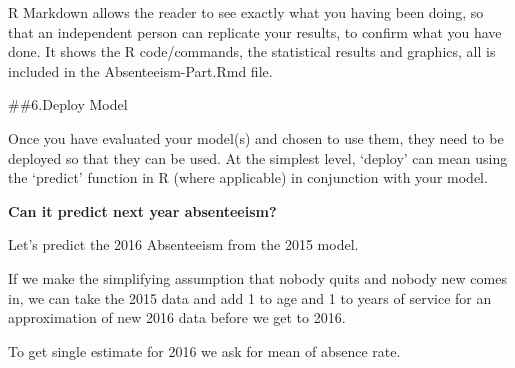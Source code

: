 \documentclass[12pt, krantz2,]{krantz}
\makeatletter
\newenvironment{Shaded}{\begin{snugshade}}{\end{snugshade}}
\newcommand{\CommentTok}[1]{\textcolor[rgb]{0.37,0.37,0.37}{\textit{#1}}}
\newcommand{\DataTypeTok}[1]{\textcolor[rgb]{0.27,0.27,0.27}{#1}}
\newcommand{\DecValTok}[1]{\textcolor[rgb]{0.06,0.06,0.06}{#1}}
\newcommand{\KeywordTok}[1]{\textcolor[rgb]{0.27,0.27,0.27}{\textbf{#1}}}
\newcommand{\NormalTok}[1]{#1}
\newcommand{\OperatorTok}[1]{\textcolor[rgb]{0.43,0.43,0.43}{\textbf{#1}}}
\newcommand{\StringTok}[1]{\textcolor[rgb]{0.5,0.5,0.5}{#1}}
\newenvironment{kframe}{%
\medskip{}
\setlength{\fboxsep}{.8em}
 \def\at@end@of@kframe{}%
 \ifinner\ifhmode%
  \def\at@end@of@kframe{\end{minipage}}%
  \begin{minipage}{\columnwidth}%
 \fi\fi%
 \def\FrameCommand##1{\hskip\@totalleftmargin \hskip-\fboxsep
 \colorbox{shadecolor}{##1}\hskip-\fboxsep
     \hskip-\linewidth \hskip-\@totalleftmargin \hskip\columnwidth}%
 \MakeFramed {\advance\hsize-\width
   \@totalleftmargin\z@ \linewidth\hsize
   \@setminipage}}%
 {\par\unskip\endMakeFramed%
 \at@end@of@kframe}
\renewenvironment{Shaded}{\begin{kframe}}{\end{kframe}}
\makeatother
\begin{document}
R Markdown allows the reader to see exactly what you having been doing, so that an independent person can replicate your results, to confirm what you have done. It shows the R code/commands, the statistical results and graphics, all is included in the Absenteeism-Part.Rmd file.

\#\#6.Deploy Model

Once you have evaluated your model(s) and chosen to use them, they need to be deployed so that they can be used. At the simplest level, `deploy' can mean using the `predict' function in R (where applicable) in conjunction with your model.

\textbf{Can it predict next year absenteeism?}

Let's predict the 2016 Absenteeism from the 2015 model.

If we make the simplifying assumption that nobody quits and nobody new comes in, we can take the 2015 data and add 1 to age and 1 to years of service for an approximation of new 2016 data before we get to 2016.

\begin{Shaded}
\end{Shaded}

To get single estimate for 2016 we ask for mean of absence rate.

\begin{Shaded}
\end{Shaded}
\end{document}
